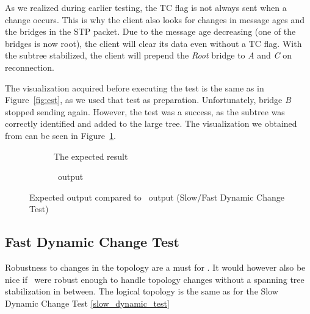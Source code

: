 As we realized during earlier testing, the TC flag is not always sent when a change occurs.
This is why the client also looks for changes in message ages and the bridges in the STP packet.
Due to the message age decreasing (one of the bridges is now root), the client will clear its data even without a TC flag.
With the subtree stabilized, the client will prepend the \textit{Root} bridge to \textit{A} and \textit{C} on reconnection. 

The visualization acquired before executing the test is the same as in Figure~\ref{fig:est}, as we used that test as preparation.
Unfortunately, bridge \textit{B} stopped sending again.
However, the test was a success, as the subtree was correctly identified and added to the large tree.
The visualization we obtained from \tool can be seen in Figure~\ref{fig:dynAfter}.
\begin{figure}[p]
    \begin{subfigure}[b]{\textwidth}
        \centering
        \caption{The expected result}
    \end{subfigure}
    \vspace{0.5cm}
    \begin{subfigure}[b]{\textwidth}
        \centering
        
        \caption{\tool\ output}
    \end{subfigure}
    \caption{Expected output compared to \tool\ output (Slow/Fast Dynamic Change Test)}
    \label{fig:dynAfter}
\end{figure}

\subsection*{Fast Dynamic Change Test}
\label{fast_dynamic_test}
Robustness to changes in the topology are a must for \tool.
It would however also be nice if \tool\ were robust enough to handle topology changes without a spanning tree stabilization in between.
The logical topology is the same as for the Slow Dynamic Change Test \ref{slow_dynamic_test}

